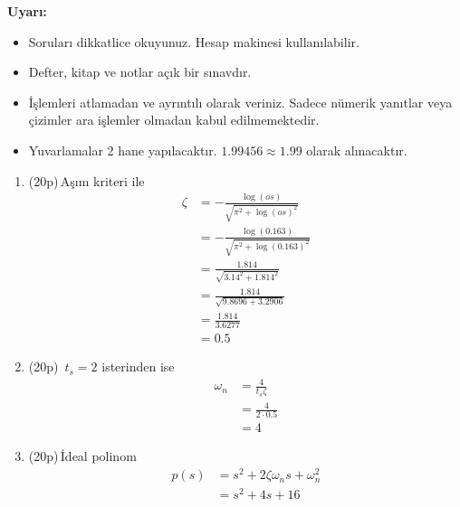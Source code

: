 \noindent\textbf{Uyarı:}
\begin{itemize}\bfseries
	\item Soruları dikkatlice okuyunuz. Hesap makinesi kullanılabilir.
	\item Defter, kitap ve notlar açık bir sınavdır.
	\item İşlemleri atlamadan ve ayrıntılı olarak veriniz. Sadece nümerik yanıtlar veya çizimler ara işlemler olmadan kabul edilmemektedir.
	\item Yuvarlamalar 2 hane yapılacaktır. $\mathbf{1.99456\approx1.99}$ olarak alınacaktır.
\end{itemize}

\begin{enumerate}[\bfseries S1.]
	\item (20p)\,Aşım kriteri ile
	      \begin{equation}
		      \begin{split}
			      \zeta & =-\frac{\log(os)}{\sqrt{\pi^2+\log(os)^2}}       \\
			            & =-\frac{\log(0.163)}{\sqrt{\pi^2+\log(0.163)^2}} \\
			            & =\frac{1.814}{\sqrt{3.14^2+1.814^2}}             \\
			            & =\frac{1.814}{\sqrt{9.8696+3.2906}}              \\
			            & =\frac{1.814}{3.6277}                            \\
			            & =0.5
		      \end{split}
	      \end{equation}
	\item (20p)\,
	      $t_s=2$ isterinden ise
	      \begin{equation}
		      \begin{split}
			      \omega_n & =\frac{4}{t_s\zeta}   \\
			               & =\frac{4}{2\cdot 0.5} \\
			               & =4
		      \end{split}
	      \end{equation}
	\item (20p)\,İdeal polinom
	      \begin{equation}
		      \begin{split}
			      p(s) & =s^2+2\zeta \omega_n s+\omega_n^2 \\
			           & =s^2+4s+16
		      \end{split}
	      \end{equation}

\end{enumerate}

